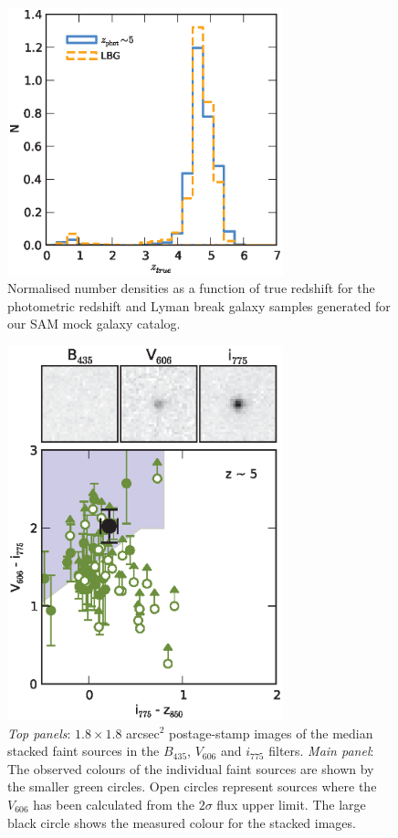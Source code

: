 \begin{figure}
\centering
\includegraphics[width=80mm]{plots/figA4.eps}
\caption{Normalised number densities as a function of true redshift for the photometric redshift and Lyman break galaxy samples generated for our SAM mock galaxy catalog.}
\label{fig:mock_z_hist}
\end{figure}


\begin{figure}
\centering
\includegraphics[width=80mm]{plots/figA5.eps}
\caption{\emph{Top panels}: $1.8 \times 1.8$ arcsec$^2$ postage-stamp images of the median stacked faint sources in the $B_{435}$, $V_{606}$ and $i_{775}$ filters. \emph{Main panel}: The observed colours of the individual faint sources are shown by the smaller green circles. Open circles represent sources where the $V_{606}$ has been calculated from the $2\sigma$ flux upper limit. The large black circle shows the measured colour for the stacked images.}
\label{fig:stack_colours}
\end{figure}

